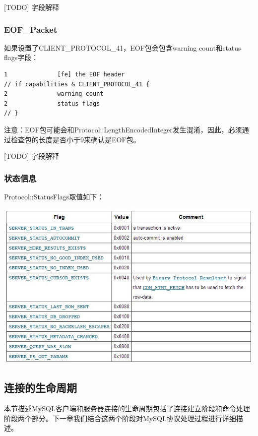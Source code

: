\documentclass[a4paper, titlepage, 10pt, bookmark]{article}
\begin{document}
[TODO] 字段解释

\subsubsection{EOF\_Packet}
如果设置了CLIENT\_PROTOCOL\_41，EOF包会包含warning count和status flags字段：
\begin{spacing}{1.0}
\begin{lstlisting}
1              [fe] the EOF header
// if capabilities & CLIENT_PROTOCOL_41 {
2              warning count
2              status flags
// }
\end{lstlisting}
\end{spacing}

注意：EOF包可能会和Protocol::LengthEncodedInteger发生混淆，因此，必须通过检查包的长度是否小于9来确认是EOF包。

[TODO] 字段解释

\subsubsection{状态信息}
Protocol::StatusFlags取值如下：
\begin{center}
\includegraphics[width=7in]{001.jpg}
\end{center}



\subsection{连接的生命周期}
本节描述MySQL客户端和服务器连接的生命周期包括了连接建立阶段和命令处理阶段两个部分。下一章我们结合这两个阶段对MySQL协议处理过程进行详细描述。

\newpage
\end{document}
